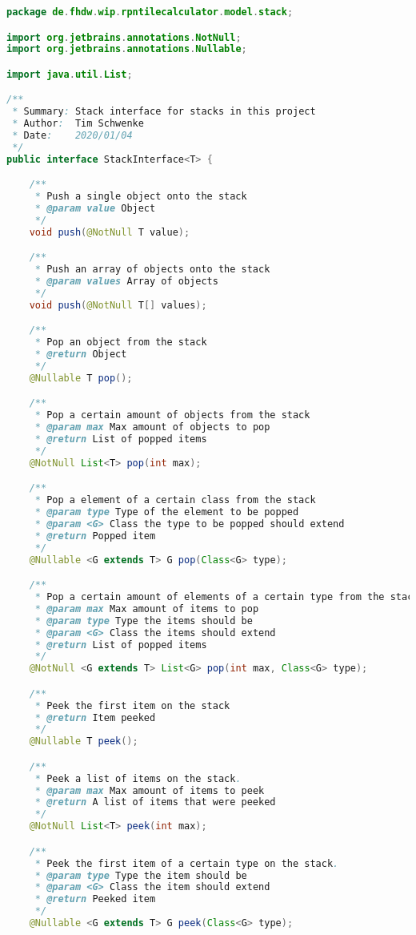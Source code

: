 \begin{lstlisting}[caption=StackInterface (Schwenke),label=list:StackInterface,language=Java]
package de.fhdw.wip.rpntilecalculator.model.stack;

import org.jetbrains.annotations.NotNull;
import org.jetbrains.annotations.Nullable;

import java.util.List;

/**
 * Summary: Stack interface for stacks in this project
 * Author:  Tim Schwenke
 * Date:    2020/01/04
 */
public interface StackInterface<T> {

    /**
     * Push a single object onto the stack
     * @param value Object
     */
    void push(@NotNull T value);

    /**
     * Push an array of objects onto the stack
     * @param values Array of objects
     */
    void push(@NotNull T[] values);

    /**
     * Pop an object from the stack
     * @return Object
     */
    @Nullable T pop();

    /**
     * Pop a certain amount of objects from the stack
     * @param max Max amount of objects to pop
     * @return List of popped items
     */
    @NotNull List<T> pop(int max);

    /**
     * Pop a element of a certain class from the stack
     * @param type Type of the element to be popped
     * @param <G> Class the type to be popped should extend
     * @return Popped item
     */
    @Nullable <G extends T> G pop(Class<G> type);

    /**
     * Pop a certain amount of elements of a certain type from the stack.
     * @param max Max amount of items to pop
     * @param type Type the items should be
     * @param <G> Class the items should extend
     * @return List of popped items
     */
    @NotNull <G extends T> List<G> pop(int max, Class<G> type);

    /**
     * Peek the first item on the stack
     * @return Item peeked
     */
    @Nullable T peek();

    /**
     * Peek a list of items on the stack.
     * @param max Max amount of items to peek
     * @return A list of items that were peeked
     */
    @NotNull List<T> peek(int max);

    /**
     * Peek the first item of a certain type on the stack.
     * @param type Type the item should be
     * @param <G> Class the item should extend
     * @return Peeked item
     */
    @Nullable <G extends T> G peek(Class<G> type);


\end{lstlisting}
